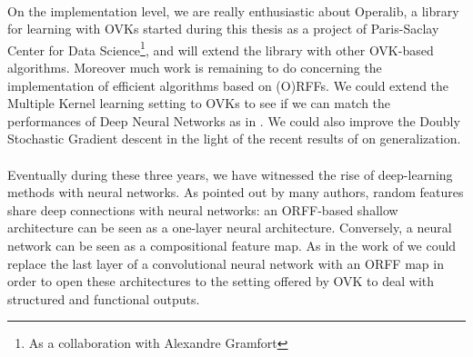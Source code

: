 \paragraph{}
On the implementation level, we are really enthusiastic about Operalib, a
library for learning with \aclp{OVK} started during this thesis as a project of
Paris-Saclay Center for Data Science\footnote{As a collaboration with
Alexandre Gramfort}, and will extend the library with other \acs{OVK}-based
algorithms. Moreover much work is remaining to do concerning the implementation
of efficient algorithms based on (O)\acsp{RFF}. We could extend the Multiple
Kernel learning setting to \acsp{OVK} to see if we can match the performances
of Deep Neural Networks as in \citet{lu2014scale}.  We could also improve the
Doubly Stochastic Gradient descent in the light of the recent results of
\citet{rudi2016generalization} on generalization.
\paragraph{}
Eventually during these three years, we have witnessed the rise of deep-learning
methods with neural networks. As pointed out by many authors, random features
share deep connections with neural networks: an ORFF-based shallow architecture
can be seen as a one-layer  neural architecture. Conversely, a neural network
can be seen as
a compositional feature map. As in the work of \citet{yang2015deep} we could
replace the last layer of a convolutional neural network
\citep{lecun1995convolutional} with an \acs{ORFF} map in order to open these
architectures to the setting offered by OVK to deal with structured and
functional outputs.
